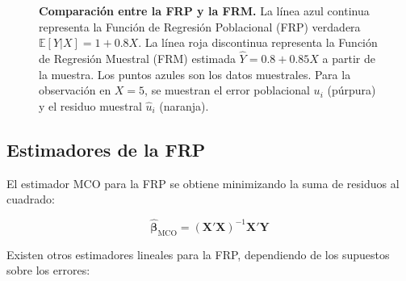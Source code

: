 \documentclass[11pt,a4paper]{article}
\begin{document}
\begin{figure}[H]
\caption{\textbf{Comparación entre la FRP y la FRM.} La línea azul continua representa la Función de Regresión Poblacional (FRP) verdadera \(\mathbb{E}[Y|X]=1+0.8X\). La línea roja discontinua representa la Función de Regresión Muestral (FRM) estimada \(\hat{Y}=0.8+0.85X\) a partir de la muestra. Los puntos azules son los datos muestrales. Para la observación en \(X=5\), se muestran el error poblacional \(u_i\) (púrpura) y el residuo muestral \(\hat{u}_i\) (naranja).}
\label{fig:frp_frm}
\end{figure}
\subsection{Estimadores de la FRP}

El estimador MCO para la FRP se obtiene minimizando la suma de residuos al cuadrado:

\[
\hat{\boldsymbol{\beta}}_{\text{MCO}} = (\mathbf{X}'\mathbf{X})^{-1}\mathbf{X}'\mathbf{Y}
\]

Existen otros estimadores lineales para la FRP, dependiendo de los supuestos sobre los errores:
\end{document}
